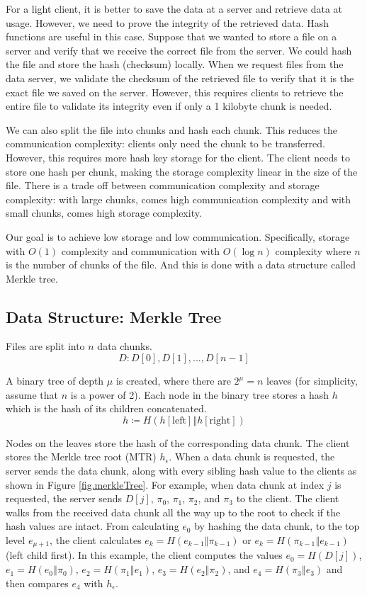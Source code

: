 For a light client, it is better to save the data at a server and retrieve data at usage. However, we need to prove the integrity of the retrieved data. Hash functions are useful in this case. Suppose that we wanted to store a file on a server and verify that we receive the correct file from the server. We could hash the file and store the hash (checksum) locally. When we request files from the data server, we validate the checksum of the retrieved file to verify that it is the exact file we saved on the server. However, this requires clients to retrieve the entire file to validate its integrity even if only a 1 kilobyte chunk is needed.

We can also split the file into chunks and hash each chunk. This reduces the communication complexity: clients only need the chunk to be transferred. However, this requires more hash key storage for the client. The client needs to store one hash per chunk, making the storage complexity linear in the size of the file. There is a trade off between communication complexity and storage complexity: with large chunks, comes high communication complexity and with small chunks, comes high storage complexity.

Our goal is to achieve low storage and low communication. Specifically, storage with $O(1)$ complexity and communication with $O(\log n)$ complexity where $n$ is the number of chunks of the file. And this is done with a data structure called Merkle tree.

\subsection{Data Structure: Merkle Tree}

Files are split into $n$ data chunks.
$$
D: D[0], D[1], ..., D[n-1]
$$

A binary tree of depth $\mu$ is created, where there are $2^\mu = n$ leaves (for simplicity, assume that $n$ is a power of 2). Each node in the binary tree stores a hash $h$ which is the hash of its children concatenated.
$$
h \coloneqq H(h[\mathrm{left}] \mathbin\Vert h[\mathrm{right}])
$$

Nodes on the leaves store the hash of the corresponding data chunk. The client stores the Merkle tree root (MTR) $h_\epsilon$. When a data chunk is requested, the server sends the data chunk, along with every sibling hash value to the clients as shown in Figure \ref{fig.merkleTree}. For example, when data chunk at index $j$ is requested, the server sends $D[j]$, $\pi_0$, $\pi_1$, $\pi_2$, and $\pi_3$ to the client. The client walks from the received data chunk all the way up to the root to check if the hash values are intact. From calculating $e_0$ by hashing the data chunk, to the top level $e_{\mu+1}$, the client calculates $e_k = H(e_{k-1} \mathbin\Vert \pi_{k-1})$ or $e_k = H(\pi_{k-1} \mathbin\Vert e_{k-1})$(left child first). In this example, the client computes the values $e_0 = H(D[j])$, $e_1 = H(e_0 \mathbin\Vert \pi_0)$, $e_2 = H(\pi_1 \mathbin\Vert e_1)$, $e_3 = H(e_2 \mathbin\Vert \pi_2)$, and $e_4 = H(\pi_3 \mathbin\Vert e_3)$ and then compares $e_4$ with $h_\epsilon$.

